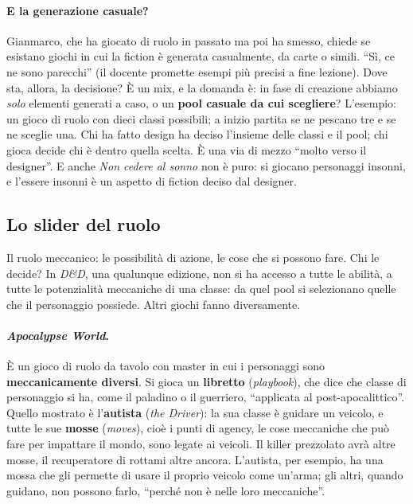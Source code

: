 \paragraph{E la generazione casuale?} Gianmarco, che ha giocato di ruolo in passato
ma poi ha smesso, chiede se esistano giochi in cui la fiction è generata
casualmente, da carte o simili. ``Sì, ce ne sono parecchi'' (il docente promette
esempi più precisi a fine lezione). Dove sta, allora, la decisione? È un mix, e la
domanda è: in fase di creazione abbiamo \emph{solo} elementi generati a caso, o un
\textbf{pool casuale da cui scegliere}? L'esempio: un gioco di ruolo con dieci
classi possibili; a inizio partita se ne pescano tre e se ne sceglie una. Chi ha
fatto design ha deciso l'insieme delle classi e il pool; chi gioca decide chi è
dentro quella scelta. È una via di mezzo ``molto verso il designer''. E anche
\emph{Non cedere al sonno} non è puro: si giocano personaggi insonni, e l'essere
insonni è un aspetto di fiction deciso dal designer.

\subsection{Lo slider del ruolo}

Il ruolo meccanico: le possibilità di azione, le cose che si possono fare. Chi le
decide? In \emph{D\&D}, una qualunque edizione, non si ha accesso a tutte le
abilità, a tutte le potenzialità meccaniche di una classe: da quel pool si
selezionano quelle che il personaggio possiede. Altri giochi fanno diversamente.

\paragraph{\emph{Apocalypse World}.} È un gioco di ruolo da tavolo con master in cui i
personaggi sono \textbf{meccanicamente diversi}. Si gioca un \textbf{libretto}
(\emph{playbook}), che dice che classe di personaggio si ha, come il paladino o il
guerriero, ``applicata al post-apocalittico''. Quello mostrato è l'\textbf{autista}
(\emph{the Driver}): la sua classe è guidare un veicolo, e tutte le sue
\textbf{mosse} (\emph{moves}), cioè i punti di agency, le cose meccaniche che può
fare per impattare il mondo, sono legate ai veicoli. Il killer prezzolato avrà altre
mosse, il recuperatore di rottami altre ancora. L'autista, per esempio, ha una mossa
che gli permette di usare il proprio veicolo come un'arma; gli altri, quando
guidano, non possono farlo, ``perché non è nelle loro meccaniche''.

